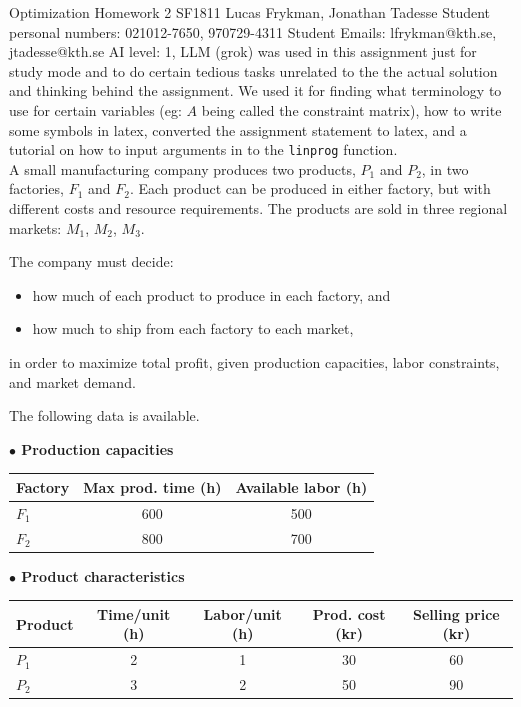 \documentclass{assignment}
\def\code#1{\texttt{#1}}
\begin{document}
{Optimization}
{Homework 2}
{SF1811}
{Lucas Frykman, Jonathan Tadesse}
{Student personal numbers: 021012-7650, 970729-4311}
{Student Emails: lfrykman@kth.se, jtadesse@kth.se}
AI level: 1, LLM (grok) was used in this assignment just for study mode and to do certain tedious tasks unrelated to the the actual solution and thinking behind the assignment. We used it for finding what terminology to use for certain variables (eg: $A$ being called the constraint matrix), how to write some symbols in latex, converted the assignment statement to latex, and a tutorial on how to input arguments in to the \code{linprog} function. \\

A small manufacturing company produces two products, $P_1$ and $P_2$, in two factories, $F_1$ and $F_2$. Each product can be produced in either factory, but with different costs and resource requirements. The products are sold in three regional markets: $M_1$, $M_2$, $M_3$.

The company must decide:
\begin{itemize}
    \item how much of each product to produce in each factory, and
    \item how much to ship from each factory to each market,
\end{itemize}
in order to maximize total profit, given production capacities, labor constraints, and market demand.

The following data is available.

\textbf{$\bullet$ Production capacities}

\begin{center}
\begin{tabular}{lcc}
\toprule
Factory & Max prod. time (h) & Available labor (h) \\
\midrule
$F_1$   & 600                & 500                 \\
$F_2$   & 800                & 700                 \\
\bottomrule
\end{tabular}
\end{center}

\textbf{$\bullet$ Product characteristics}

\begin{center}
\begin{tabular}{lcccc}
\toprule
Product & Time/unit (h) & Labor/unit (h) & Prod. cost (kr) & Selling price (kr) \\
\midrule
$P_1$   & 2             & 1              & 30              & 60                 \\
$P_2$   & 3             & 2              & 50              & 90                 \\
\bottomrule
\end{tabular}
\end{center}
\end{document}
